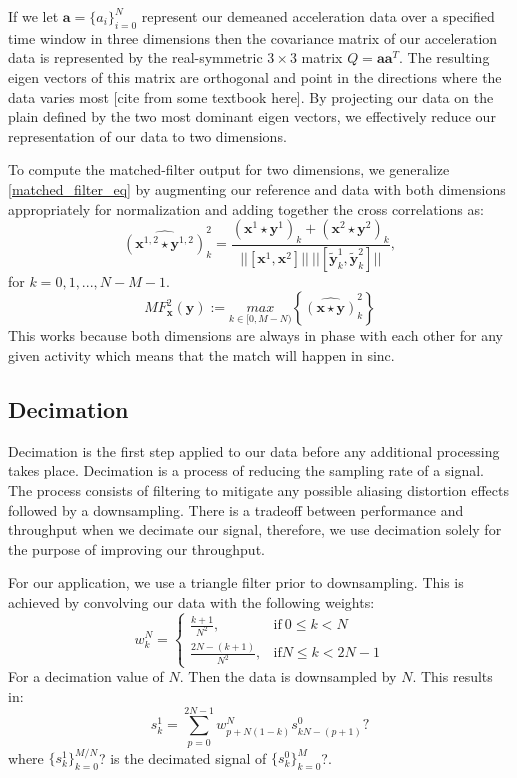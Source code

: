 \documentclass[journal]{IEEEtran}
\begin{document}
If we let $\textbf{a} = \{a_i\}_{i=0}^{N}$ represent our demeaned acceleration data over a specified time window in three dimensions then the covariance matrix of our acceleration data is represented by the real-symmetric $3 \times 3$ matrix $Q = \textbf{a} \textbf{a}^T$.
The resulting eigen vectors of this matrix are orthogonal and point in the directions where the data varies most [cite from some textbook here].
By projecting our data on the plain defined by the two most dominant eigen vectors, we effectively reduce our representation of our data to two dimensions.

To compute the matched-filter output for two dimensions, we generalize \eqref{matched_filter_eq} by augmenting our reference and data with both dimensions appropriately for normalization and adding together the cross correlations as:
%
\begin{equation} \label{cross_correlation_eq_2}
\widehat{(\textbf{x}^{1,2} \star \textbf{y}^{1,2})}_k^2 = \frac{(\textbf{x}^1 \star \textbf{y}^1)_k + (\textbf{x}^2 \star \textbf{y}^2)_k}{||[ \textbf{x}^1, \textbf{x}^2 ]|| \ || [ \widetilde{\textbf{y}}_k^1, \widetilde{\textbf{y}}_k^2 ] || },
\end{equation}
%
for $ k = 0,1,...,N-M-1 $.\\
%
\begin{equation} \label{matched_filter_eq_2}
MF_{\textbf{x}}^2(\textbf{y}) := \underset{k \in [0, M-N)}{max} \left \{\widehat{(\textbf{x} \star \textbf{y})}^2_k \right \}
\end{equation}
%
This works because both dimensions are always in phase with each other for any given activity which means that the match will happen in sinc.
%
\subsection{Decimation}
Decimation is the first step applied to our data before any additional processing takes place.
Decimation is a process of reducing the sampling rate of a signal.
The process consists of filtering to mitigate any possible aliasing distortion effects followed by a downsampling.
There is a tradeoff between performance and throughput when we decimate our signal, therefore, we use decimation solely for the purpose of improving our throughput.

For our application, we use a triangle filter prior to downsampling. This is achieved by convolving our data with the following weights:
%
\begin{equation} \label{trignal_filter_weights}
w_k^N =
\begin{cases}
  \frac{k+1}{N^2}, & \text{if}\ 0 \leq k < N \\
  \frac{2N - (k + 1)}{N^2}, & \text{if} N \leq k < 2N - 1
\end{cases}
\end{equation}
%
For a decimation value of $N$. Then the data is downsampled by $N$. This results in:
%
\begin{equation} \label{decimated_signal}
s_k^1 = \sum_{p=0}^{2N-1} w_{p+N(1-k)}^N s_{kN - (p+1)}^0 ?
\end{equation}
%
where $\{s_k^1\}_{k=0}^{M/N}$? is the decimated signal of $\{s_k^0\}_{k=0}^M$?.
\end{document}

